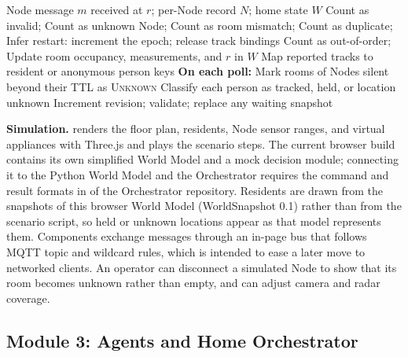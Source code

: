 \documentclass[conference]{IEEEtran}
\newcommand{\fld}[1]{\texttt{\detokenize{#1}}}
\begin{document}
\begin{algorithm}[!tbp]
\caption{World Model ingestion and snapshot publication}
\label{alg:wm}
\footnotesize
\begin{algorithmic}[1]
\Require Node message $m$ received at $r$; per-Node record $N$; home state $W$
  \State Count as invalid; \Return
{}
  \State Count as unknown Node; \Return
{}
  \State Count as room mismatch; \Return
\EndIf
{}
  \State Count as duplicate; \Return
\EndIf
{}
    \State Infer restart: increment the epoch; release track bindings
  \Else
    \State Count as out-of-order; \Return
  \EndIf
\EndIf
\State Update room occupancy, measurements, and $r$ in $W$
\State Map reported tracks to resident or anonymous person keys
\Statex \textbf{On each poll:}
\State Mark rooms of Nodes silent beyond their TTL as \textsc{Unknown}
\State Classify each person as tracked, held, or location unknown
  \State Increment revision; validate; replace any waiting snapshot
\EndIf
\end{algorithmic}
\end{algorithm}

\textbf{Simulation.} \fld{demo3d.html} renders the floor plan,
residents, Node sensor ranges, and virtual appliances with Three.js
and plays the scenario steps. The current browser build contains its
own simplified World Model and a mock decision module; connecting it
to the Python World Model and the Orchestrator requires the command
and result formats in  of the
Orchestrator repository. Residents are drawn from the snapshots of
this browser World Model (WorldSnapshot 0.1) rather than from the
scenario script, so held or unknown locations appear as that model
represents them. Components exchange messages through an in-page bus
that follows MQTT topic and wildcard rules, which is intended to ease
a later move to networked clients. An operator can disconnect a
simulated Node to show that its room becomes unknown rather than
empty, and can adjust camera and radar coverage.

\subsection{Module 3: Agents and Home Orchestrator}
\end{document}
